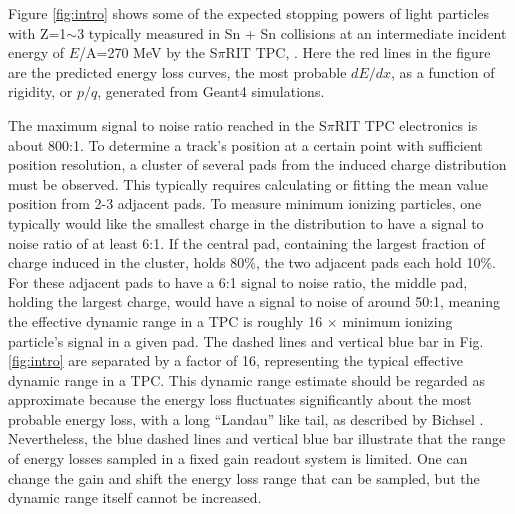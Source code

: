 \documentclass[review,number,sort&compress]{elsarticle}
\begin{document}
Figure \ref{fig:intro} shows some of the expected stopping powers of light particles with Z=1$\sim$3 typically measured in Sn + Sn collisions at an intermediate incident energy of $E$/A=270 MeV by the S$\pi$RIT TPC, \cite{shane}. Here the red lines in the figure are the predicted energy loss curves, the most probable $dE/dx$, as a function of rigidity, or $p/q$, generated from Geant4 \cite{genfit} simulations. 

The maximum signal to noise ratio reached in the S$\pi$RIT TPC electronics is about 800:1. To determine a track's position at a certain point with sufficient position resolution, a cluster of several pads from the induced charge distribution must be observed. This typically requires calculating or fitting the mean value position from 2-3 adjacent pads. To measure minimum ionizing particles, one typically would like the smallest charge in the distribution to have a signal to noise ratio of at least 6:1. If the central pad, containing the largest fraction of charge induced in the cluster, holds 80\%, the two adjacent pads each hold 10\%. For these adjacent pads to have a 6:1 signal to noise ratio, the middle pad, holding the largest charge, would have a signal to noise of around 50:1, meaning the effective dynamic range in a TPC is roughly 16 $\times$ minimum ionizing particle's signal in a given pad. 
The dashed lines and vertical blue bar in Fig.~ \ref{fig:intro} are separated by a factor of 16, representing the typical effective dynamic range in a TPC. This dynamic range estimate should be regarded as approximate because the energy loss fluctuates significantly about the most probable energy loss, with a long ``Landau'' like tail, as described by Bichsel \cite{bichsel}. Nevertheless, the blue dashed lines and vertical blue bar illustrate that the range of energy losses sampled in a fixed gain readout system is limited. One can change the gain and shift the energy loss range that can be sampled, but the dynamic range itself cannot be increased.
\end{document}
